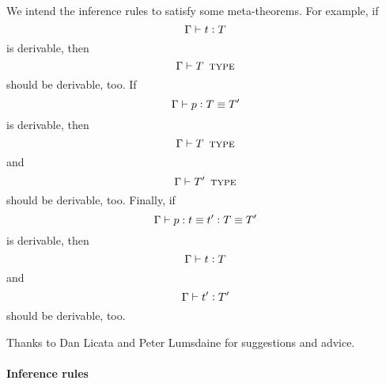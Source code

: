 \documentclass[11pt]{article}
\newcommand{\eqd}{\equiv}
\newcommand{\ccolon}{\vcentcolon}
\newcommand{\Type}{\mathop{\text{ \sc type}}}
\begin{document}
We intend the inference rules to satisfy some meta-theorems.  For example, if 
$$ \Gamma \vdash t \ccolon T  $$
is derivable, then
$$ \Gamma \vdash T \Type  $$
should be derivable, too.  If
$$ \Gamma \vdash p \ccolon T \eqd T'  $$
is derivable, then
$$ \Gamma \vdash T \Type  $$
and
$$ \Gamma \vdash T' \Type  $$
should be derivable, too.  Finally, if 
$$ \Gamma \vdash p : t \eqd t' \ccolon T \eqd T'  $$
is derivable, then
$$ \Gamma \vdash t \ccolon T  $$
and
$$ \Gamma \vdash t' \ccolon T'  $$
should be derivable, too.

Thanks to Dan Licata and Peter Lumsdaine for suggestions and advice.

\paragraph{Inference rules} 
\end{document}

